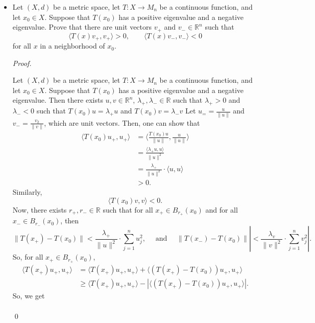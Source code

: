 \documentclass[12pt]{article}
\newenvironment{problem}[2][Problem]{\begin{trivlist}
\item[\hskip \labelsep {\bfseries #1}\hskip \labelsep {\bfseries
#2.}]}{\end{trivlist}}
\newenvironment{sol}
    {\emph{Proof.}
    }
    {
    \qed
    }
\begin{document}
  
  \begin{problem}{18} \text{ } \begin{itemize}
      \item[(a)] Let $(X,d)$ be a metric space, let $T : X \to M_n$ be a continuous function, and let $x_0 \in X$. Suppose that $T(x_0)$ has a positive eigenvalue and a negative eigenvalue. Prove that there are unit vectors $v_+$ and $v_- \in \mathbb{R}^n$ such that $$\langle T(x)v_+,v_+ \rangle > 0, \hspace{2em} \langle T(x)v_-,v_- \rangle < 0$$ for all $x$ in a neighborhood of $x_0$.
      
      \begin{sol}
      Let $(X,d)$ be a metric space, let $T : X \to M_n$ be a continuous function, and let $x_0 \in X$. Suppose that $T(x_0)$ has a positive eigenvalue and a negative eigenvalue. Then there exists $u,v \in \mathbb{R}^n$, $\lambda_+,\lambda_- \in \mathbb{R}$ such that $\lambda_+ > 0$ and $\lambda_- < 0$ such that $T(x_0)u = \lambda_+u$ and $T(x_0)v = \lambda_-v$ Let $u_= = \frac{u}{\lVert u \rVert}$ and $v_- = \frac{v_2}{\lVert v \rVert}$, which are unit vectors. Then, one can show that \begin{align*}
          \langle T(x_0)u_+,u_+\rangle &= \langle \frac{T(x_0)u}{\lVert u \rVert}, \frac{u}{\lVert u \rVert}\rangle \\ &= \frac{\langle \lambda_+u,u\rangle}{\lVert u \rVert^2} \\ &= \frac{\lambda_+}{\lVert u \rVert^2} \cdot \langle u, u \rangle \\ &> 0.
      \end{align*}
      Similarly, $$\langle T(x_0)v,v\rangle < 0.$$ Now, there exists $r_+,r_- \in \mathbb{R}$ such that for all $x_+ \in B_{r_+}(x_0)$ and for all $x_- \in B_{r_-}(x_0)$, then $$\lVert T(x_+) - T(x_0) \rVert < \frac{\lambda_+}{\lVert u \rVert^2} \cdot \sum_{j = 1}^nu_j^2, \hspace{1em} \text{ and } \hspace{1em} \lVert T(x_-) - T(x_0) \rVert \left| < \frac{\lambda_v}{\lVert v \rVert^2} \cdot \sum_{j = 1}^nv_j^2 \right|.$$ So, for all $x_+ \in B_{r_+}(x_0)$, \begin{align*}
          \langle T(x_+)u_+, u_+ \rangle &= \langle T(x_+)u_+, u_+ \rangle + \langle (T(x_+) - T(x_0))u_+, u_+ \rangle \\ &\geq \langle T(x_+)u_+, u_+ \rangle - \left| \langle (T(x_+) - T(x_0))u_+, u_+ \rangle \right|.
      \end{align*}
      So, we get \begin{align*}

\end{align*}
\end{sol}
\end{itemize}
\end{problem}
\end{document}
